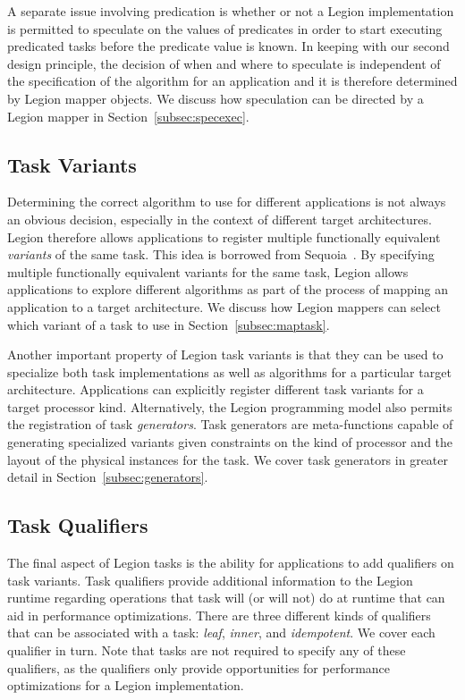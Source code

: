 A separate issue involving predication is
whether or not a Legion implementation is permitted 
to speculate on the values of predicates in
order to start executing predicated tasks
before the predicate value is known. In keeping
with our second design principle, the
decision of when and where to speculate is
independent of the specification of the 
algorithm for an application and 
it is therefore determined by Legion
mapper objects. We discuss how speculation
can be directed by a Legion mapper in
Section~\ref{subsec:specexec}.

\subsection{Task Variants}
\label{subsec:variants}
Determining the correct algorithm to use for
different applications is not always an 
obvious decision, especially in the context
of different target architectures. Legion
therefore allows applications to register
multiple functionally equivalent {\em variants}
of the same task. This idea is borrowed
from Sequoia~\cite{Sequoia06}. By specifying
multiple functionally equivalent variants
for the same task, Legion allows applications
to explore different algorithms as part of
the process of mapping an application to 
a target architecture. We discuss how 
Legion mappers can select which variant of 
a task to use in Section~\ref{subsec:maptask}.

Another important property of Legion task variants
is that they can be used to specialize both task
implementations as well as algorithms for a 
particular target architecture. Applications can
explicitly register different task variants for
a target processor kind. Alternatively, the Legion
programming model also permits the registration 
of task {\em generators}. Task generators are
meta-functions capable of generating specialized
variants given constraints on the kind of processor
and the layout of the physical instances for the
task. We cover task generators in greater detail
in Section~\ref{subsec:generators}.

\subsection{Task Qualifiers}
\label{subsec:qualifiers}
The final aspect of Legion tasks is the
ability for applications to add qualifiers on
task variants. Task qualifiers provide additional
information to the Legion runtime regarding 
operations that task will (or will not) do at
runtime that can aid in performance optimizations.
There are three different kinds of qualifiers that 
can be associated with a task: {\em leaf}, 
{\em inner}, and {\em idempotent}. We cover
each qualifier in turn. Note that tasks are
not required to specify any of these qualifiers,
as the qualifiers only provide opportunities
for performance optimizations for a Legion
implementation.

